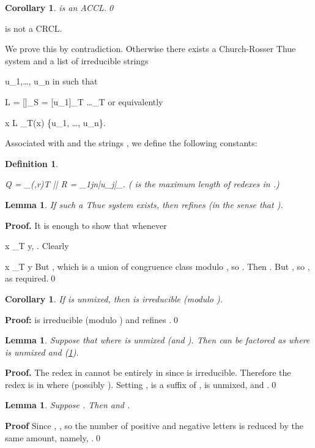 \documentclass[12pt,a4paper]{article}
\newtheorem{definition}[theorem]{Definition}
\newtheorem{lemma}[theorem]{Lemma}
\newtheorem{corollary}[theorem]{Corollary}
\newcommand{\irr}{{\text{\rm irr}}}
\numberwithin{equation}{section}
\renewcommand{\neg}{{\text{\rm neg}}}
\newcommand{\be}{}
\begin{document}
\begin{corollary}
 is an ACCL.\qed
\end{corollary}

\begin{theorem}
\label{thm: main}
 is not a CRCL.
\end{theorem}

We prove this by contradiction. Otherwise there exists
a Church-Rosser Thue system  and a list  of irreducible strings
\be
u_1,\ldots, u_n
\ee
in  such that
\be
\takeanumber
\tag{\thetheorem}
\label{eq: union}
L = [\lambda]_S = [u_1]_T \cup \ldots \cup [u_n]_T
\ee
or equivalently
\be
x \in L \iff \irr_T(x) \in \{u_1, \ldots, u_n\}.
\ee

Associated with  and the strings , we define the
following constants:
\begin{definition}
\label{def: QR}
\be
Q = \max_{(\ell,r)\in T} |\ell|
\quad{}\quad
R = \max_{1\leq j\leq n}|u_j|_\neg.
\ee
( is the maximum length of redexes in .)
\end{definition}

\begin{lemma}
\label{lem: T refines}
If such a Thue system  exists, then 
refines  (in the sense
that ).
\end{lemma}

{\bf Proof.}  It is enough to show that whenever
\be
x \to_T y,
\ee
. Clearly
\be
x \to_T y
\ee
But , which is a union of
congruence class modulo , so .
Then .
But , so
, as required.\qed

\begin{corollary}
If  is unmixed, then  is irreducible (modulo ).
\end{corollary}

{\bf Proof:}  is irreducible (modulo ) and  refines
.\qed

\begin{lemma}
\label{lem: reduced by Q}
Suppose that  where  is unmixed (and ).
Then  can be factored as  where  is  unmixed and 
(\ref{def: QR}).
\end{lemma}

{\bf Proof.} The redex in  cannot be entirely in
 since  is irreducible.  Therefore the redex
is in  where  (possibly ).
Setting ,  is a suffix of ,
 is unmixed, and .\qed

\begin{lemma}
\label{lem: balanced reduction}
Suppose . Then 
and .
\end{lemma}

{\bf Proof}
Since , ,
so the number of positive and negative letters is reduced
by the same amount, namely, .\qed
\end{document}
